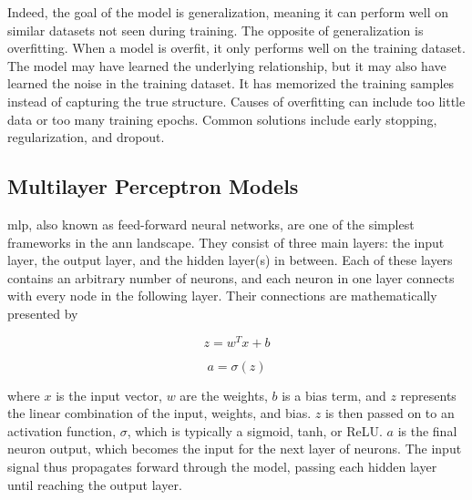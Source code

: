 Indeed, the goal of the model is generalization, meaning it can perform well on similar datasets not seen during training.
The opposite of generalization is overfitting.
When a model is overfit, it only performs well on the training dataset.
The model may have learned the underlying relationship, but it may also have learned the noise in the training dataset.
It has memorized the training samples instead of capturing the true structure.
Causes of overfitting can include too little data or too many training epochs.
Common solutions include early stopping, regularization, and dropout.

\subsection{Multilayer Perceptron Models} \label{subsec:mlp}



\gls{mlp}, also known as feed-forward neural networks, are one of the simplest frameworks in the \gls{ann} landscape.
They consist of three main layers: the input layer, the output layer, and the hidden layer(s) in between.
Each of these layers contains an arbitrary number of neurons, and each neuron in one layer connects with every node in the following layer.
Their connections are mathematically presented by

\begin{equation} \label{eq:mlp_connection}
    z = w^T x + b
\end{equation}

\begin{equation} \label{eq:mlp_activation}
    a = \sigma(z)
\end{equation}

where $x$ is the input vector, $w$ are the weights, $b$ is a bias term, and $z$ represents the linear combination of the input, weights, and bias. $z$ is then passed on to an activation function, $\sigma$, which is typically a sigmoid, tanh, or ReLU. $a$ is the final neuron output, which becomes the input for the next layer of neurons.
The input signal thus propagates forward through the model, passing each hidden layer until reaching the output layer.

